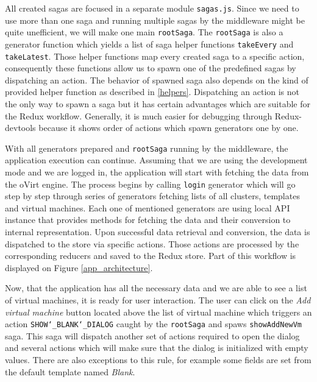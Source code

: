 All created sagas are focused in a separate module \texttt{sagas.js}. Since we need to use more than one saga and running multiple sagas by the middleware might be quite unefficient, we will make one main \texttt{rootSaga}. The \texttt{rootSaga} is also a generator function which yields a list of saga helper functions \texttt{takeEvery} and \texttt{takeLatest}. Those helper functions map every created saga to a specific action, consequently these functions allow us to spawn one of the predefined sagas by dispatching an action. The behavior of spawned saga also depends on the kind of provided helper function as described in \ref{helpers}. Dispatching an action is not the only way to spawn a saga but it has certain advantages which are suitable for the Redux workflow. Generally, it is much easier for debugging through Redux-devtools because it shows order of actions which spawn generators one by one.

With all generators prepared and \texttt{rootSaga} running by the middleware, the application execution can continue. Assuming that we are using the development mode and we are logged in, the application will start with fetching the data from the oVirt engine. The process begins by calling \texttt{login} generator which will go step by step through series of generators fetching lists of all clusters, templates and virtual machines. Each one of mentioned generators are using local API instance that provides methods for fetching the data and their conversion to internal representation. Upon successful data retrieval and conversion, the data is dispatched to the store via specific actions. Those actions are processed by the corresponding reducers and saved to the Redux store. Part of this workflow is displayed on 
Figure \ref{app_architecture}.

Now, that the application has all the necessary data and we are able to see a list of virtual machines, it is ready for user interaction. The user can click on the \textit{Add virtual machine} button located above the list of virtual machine which triggers an action \texttt{SHOW\char`_BLANK\char`_DIALOG} caught by the \texttt{rootSaga} and spaws \texttt{showAddNewVm} saga. This saga will dispatch another set of actions required to open the dialog and several actions which will make sure that the dialog is initialized with empty values. There are also exceptions to this rule, for example some fields are set from the default template named \textit{Blank}. 

